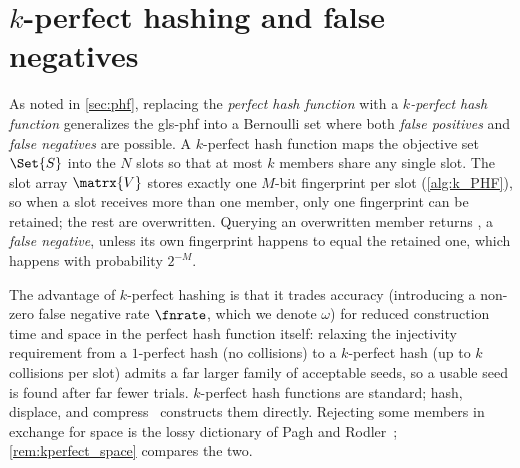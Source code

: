 \documentclass[ ../main.tex]{subfiles}
\begin{document}
\section{$k$-perfect hashing and false negatives}
\label{sec:k_perfect}
As noted in \cref{sec:phf}, replacing the \emph{perfect hash function} with a \emph{$k$-perfect hash function} generalizes the \gls{gls-phf} into a Bernoulli set where both \emph{false positives} and \emph{false negatives} are possible. A $k$-perfect hash function maps the objective set $\Set{S}$ into the $N$ slots so that at most $k$ members share any single slot. The slot array $\matrx{V}$ stores exactly one $M$-bit fingerprint per slot (\cref{alg:k_PHF}), so when a slot receives more than one member, only one fingerprint can be retained; the rest are overwritten. Querying an overwritten member returns \False, a \emph{false negative}, unless its own fingerprint happens to equal the retained one, which happens with probability $2^{-M}$.

The advantage of $k$-perfect hashing is that it trades accuracy (introducing a non-zero false negative rate $\fnrate$, which we denote $\omega$) for reduced construction time and space in the perfect hash function itself: relaxing the injectivity requirement from a $1$-perfect hash (no collisions) to a $k$-perfect hash (up to $k$ collisions per slot) admits a far larger family of acceptable seeds, so a usable seed is found after far fewer trials. $k$-perfect hash functions are standard; hash, displace, and compress~\cite{chd} constructs them directly. Rejecting some members in exchange for space is the lossy dictionary of Pagh and Rodler~\cite{pagh2001lossy}; \cref{rem:kperfect_space} compares the two.
\end{document}
